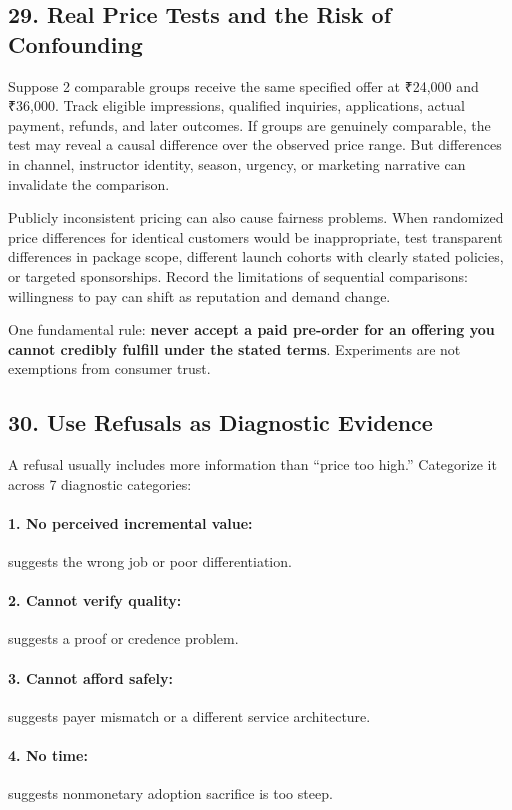 \subsection*{29. Real Price Tests and the Risk of Confounding}

Suppose 2 comparable groups receive the same specified offer at ₹24,000 and ₹36,000. Track eligible impressions, qualified inquiries, applications, actual payment, refunds, and later outcomes. If groups are genuinely comparable, the test may reveal a causal difference over the observed price range. But differences in channel, instructor identity, season, urgency, or marketing narrative can invalidate the comparison.

Publicly inconsistent pricing can also cause fairness problems. When randomized price differences for identical customers would be inappropriate, test transparent differences in package scope, different launch cohorts with clearly stated policies, or targeted sponsorships. Record the limitations of sequential comparisons: willingness to pay can shift as reputation and demand change.

One fundamental rule: \textbf{never accept a paid pre-order for an offering you cannot credibly fulfill under the stated terms}. Experiments are not exemptions from consumer trust.

\subsection*{30. Use Refusals as Diagnostic Evidence}

A refusal usually includes more information than ``price too high.'' Categorize it across 7 diagnostic categories:

\paragraph*{1. No perceived incremental value:} suggests the wrong job or poor differentiation.
\paragraph*{2. Cannot verify quality:} suggests a proof or credence problem.
\paragraph*{3. Cannot afford safely:} suggests payer mismatch or a different service architecture.
\paragraph*{4. No time:} suggests nonmonetary adoption sacrifice is too steep.
